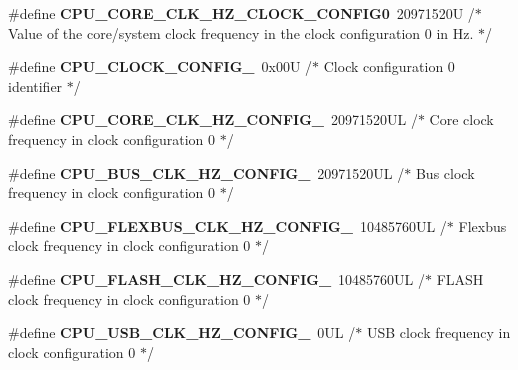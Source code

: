 \begin{DoxyCompactItemize}
\item 
\#define {\bfseries C\+P\+U\+\_\+\+C\+O\+R\+E\+\_\+\+C\+L\+K\+\_\+\+H\+Z\+\_\+\+C\+L\+O\+C\+K\+\_\+\+C\+O\+N\+F\+I\+G0}~20971520\+U /$\ast$ Value of the core/system clock frequency in the clock configuration 0 in Hz. $\ast$/\hypertarget{group___c_p_u___config__module_ga64b9007ea0c78e588ed565373bcec805}{}\label{group___c_p_u___config__module_ga64b9007ea0c78e588ed565373bcec805}

\item 
\#define {\bfseries C\+P\+U\+\_\+\+C\+L\+O\+C\+K\+\_\+\+C\+O\+N\+F\+I\+G\+\_}~0x00\+U /$\ast$ Clock configuration 0 identifier $\ast$/\hypertarget{group___c_p_u___config__module_ga4d7ade6a1c335a7e5233938aa9197157}{}\label{group___c_p_u___config__module_ga4d7ade6a1c335a7e5233938aa9197157}

\item 
\#define {\bfseries C\+P\+U\+\_\+\+C\+O\+R\+E\+\_\+\+C\+L\+K\+\_\+\+H\+Z\+\_\+\+C\+O\+N\+F\+I\+G\+\_}~20971520\+U\+L /$\ast$ Core clock frequency in clock configuration 0 $\ast$/\hypertarget{group___c_p_u___config__module_ga6fe0b841d40421ee48af4a4e01e48ddf}{}\label{group___c_p_u___config__module_ga6fe0b841d40421ee48af4a4e01e48ddf}

\item 
\#define {\bfseries C\+P\+U\+\_\+\+B\+U\+S\+\_\+\+C\+L\+K\+\_\+\+H\+Z\+\_\+\+C\+O\+N\+F\+I\+G\+\_}~20971520\+U\+L /$\ast$ Bus clock frequency in clock configuration 0 $\ast$/\hypertarget{group___c_p_u___config__module_gaf060a047649b9537eb77354ab7917a8b}{}\label{group___c_p_u___config__module_gaf060a047649b9537eb77354ab7917a8b}

\item 
\#define {\bfseries C\+P\+U\+\_\+\+F\+L\+E\+X\+B\+U\+S\+\_\+\+C\+L\+K\+\_\+\+H\+Z\+\_\+\+C\+O\+N\+F\+I\+G\+\_}~10485760\+U\+L /$\ast$ Flexbus clock frequency in clock configuration 0 $\ast$/\hypertarget{group___c_p_u___config__module_ga706c0d4dd14c93181b7a99badddc9a51}{}\label{group___c_p_u___config__module_ga706c0d4dd14c93181b7a99badddc9a51}

\item 
\#define {\bfseries C\+P\+U\+\_\+\+F\+L\+A\+S\+H\+\_\+\+C\+L\+K\+\_\+\+H\+Z\+\_\+\+C\+O\+N\+F\+I\+G\+\_}~10485760\+U\+L /$\ast$ F\+L\+A\+S\+H clock frequency in clock configuration 0 $\ast$/\hypertarget{group___c_p_u___config__module_ga09c9820f38d931a0400b832d2582c6f7}{}\label{group___c_p_u___config__module_ga09c9820f38d931a0400b832d2582c6f7}

\item 
\#define {\bfseries C\+P\+U\+\_\+\+U\+S\+B\+\_\+\+C\+L\+K\+\_\+\+H\+Z\+\_\+\+C\+O\+N\+F\+I\+G\+\_}~0\+U\+L /$\ast$ U\+S\+B clock frequency in clock configuration 0 $\ast$/\hypertarget{group___c_p_u___config__module_ga7bf843fdf59af5fcaf48bea898884a3e}{}\label{group___c_p_u___config__module_ga7bf843fdf59af5fcaf48bea898884a3e}


\end{DoxyCompactItemize}
